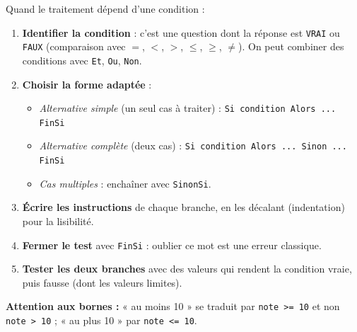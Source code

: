 \documentclass[11pt]{article}
\newcommand{\cle}[1]{{\popxbold\color{popdark}#1}}
\begin{document}
\begin{methode}
Quand le traitement dépend d'une \cle{condition} :
\begin{enumerate}
\item \textbf{Identifier la condition} : c'est une question dont la réponse est \texttt{VRAI} ou \texttt{FAUX} (comparaison avec $=$, $<$, $>$, $\leq$, $\geq$, $\neq$). On peut combiner des conditions avec \texttt{Et}, \texttt{Ou}, \texttt{Non}.
\item \textbf{Choisir la forme adaptée} :
\begin{itemize}
\item \emph{Alternative simple} (un seul cas à traiter) : \texttt{Si condition Alors ... FinSi}
\item \emph{Alternative complète} (deux cas) : \texttt{Si condition Alors ... Sinon ... FinSi}
\item \emph{Cas multiples} : enchaîner avec \texttt{SinonSi}.
\end{itemize}
\item \textbf{Écrire les instructions} de chaque branche, en les décalant (indentation) pour la lisibilité.
\item \textbf{Fermer le test} avec \texttt{FinSi} : oublier ce mot est une erreur classique.
\item \textbf{Tester les deux branches} avec des valeurs qui rendent la condition vraie, puis fausse (dont les valeurs limites).
\end{enumerate}
\textbf{Attention aux bornes :} « au moins 10 » se traduit par \texttt{note >= 10} et non \texttt{note > 10} ; « au plus 10 » par \texttt{note <= 10}.
\end{methode}
\end{document}
